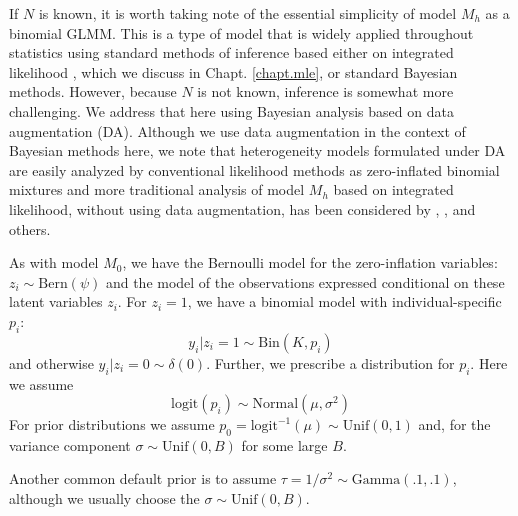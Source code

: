 If $N$ is known, it is worth taking note of the essential simplicity
of model $M_h$ as a binomial GLMM.  This is a type of model that is
widely applied throughout statistics using
standard methods of inference based either on integrated likelihood
\citep{laird_ware:1982, berger_etal:1999}, which we discuss in
Chapt. \ref{chapt.mle}, or standard Bayesian
methods. However, because $N$ is not known, inference is somewhat more
challenging. We address that here using Bayesian analysis based on
data augmentation (DA). Although we use data augmentation in the context of
Bayesian methods here, we note that
heterogeneity models formulated under DA are easily analyzed by
conventional likelihood methods as zero-inflated binomial mixtures
\citep{royle:2006} and more traditional analysis of model $M_h$ based on
integrated likelihood, without using data augmentation, has been
considered by \citet{coull_agresti:1999}, \citet{dorazio_royle:2003},
and others.

As with model $M_{0}$, we have the Bernoulli model for the
zero-inflation variables: $z_{i} \sim \mbox{Bern}(\psi)$ and the model
of the observations expressed conditional on these latent variables
$z_{i}$. For $z_{i}=1$, we have a binomial model with
individual-specific $p_{i}$:
\[
y_{i}|{z_{i} \! = \! 1} \sim \mbox{Bin}(K,p_{i})
\]
and otherwise $y_{i} |{ z_{i} \! = \! 0} \sim \delta(0)$. Further, we
prescribe a distribution for $p_{i}$. Here we assume
\[
\mathrm{logit}(p_{i}) \sim \mbox{Normal}(\mu,\sigma^2)
\]
For prior distributions we assume
$p_{0} = \mbox{logit}^{-1}(\mu) \sim
\mbox{Unif}(0,1)$ and, for the variance component
$\sigma \sim \mbox{Unif}(0,B)$ for some large $B$.

Another common default prior is to assume
$\tau = 1/\sigma^{2} \sim \mbox{Gamma}(.1,.1)$, although we usually
choose the $\sigma \sim \mbox{Unif}(0,B)$.



